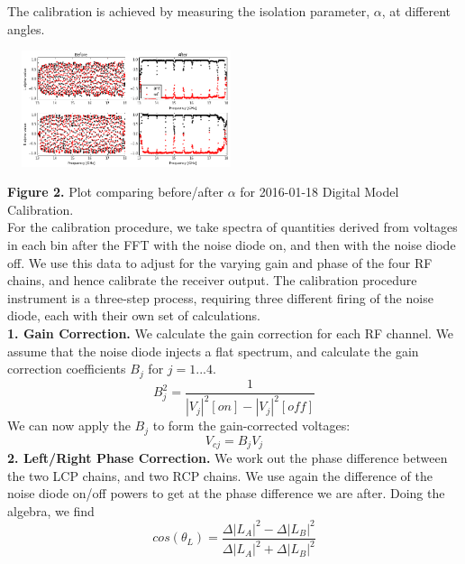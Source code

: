 \documentclass[a0paper,portrait]{baposter}
\begin{document}
\begin{poster}
{}
{\small{The calibration is achieved by measuring the isolation parameter, $\alpha$, at different angles.}
\begin{center}
\includegraphics [height=34mm, width=70mm] {Final_alpha_20170118.png}
\end{center}
\small{\textbf{Figure 2.} Plot comparing before/after $\alpha$ for 2016-01-18 Digital Model Calibration.\\
For the calibration procedure, we take spectra of quantities derived from voltages in each bin after the FFT with the noise diode on, and then with the noise diode off. We use this data to adjust for the varying gain and phase of the four RF chains, and hence calibrate the receiver output. The calibration procedure instrument is a three-step process, requiring three different firing of the noise diode, each with their own set of calculations.\\
\textbf{1. Gain Correction.} We calculate the gain correction for each RF channel. We assume that the noise diode injects a flat spectrum, and calculate the gain correction coefficients $B_{j}$ for $j=1...4$.}
\begin{equation}
B_{j}^2 = \frac{1}{|V_{j}|^2[on]-|V_{j}|^2[off]}
\end{equation}
\small{We can now apply the $B_{j}$ to form the gain-corrected voltages:}
\begin{equation}
V_{cj} = B_{j}V_{j}
\end{equation}
\small{\textbf{2. Left/Right Phase Correction.} We work out the phase difference between the two LCP chains, and two RCP chains. We use again the difference of the noise diode on/off powers to get at the phase difference we are after. Doing the algebra, we find}
\begin{equation}
cos(\theta_{L}) = \frac{\Delta|L_{A}|^2-\Delta|L_{B}|^2}{\Delta|L_{A}|^2+\Delta|L_{B}|^2}
\end{equation}
}
\end{poster}
\end{document}
